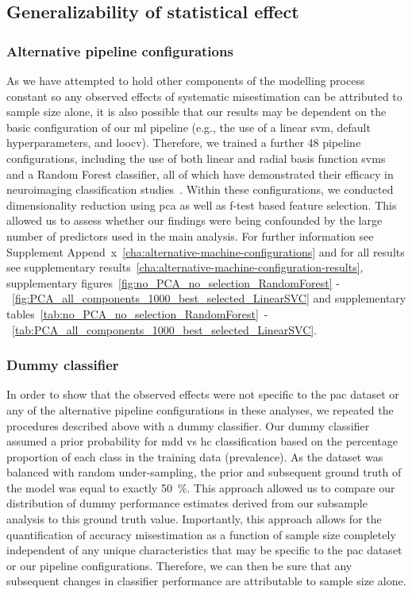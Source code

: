 \documentclass[12pt,a4paper]{article}
\begin{document}
    \subsection{Generalizability of statistical effect}

    \subsubsection{Alternative pipeline configurations}
    As we have attempted to hold other components of the modelling process constant so any observed effects of systematic misestimation can be attributed to sample size alone, it is also possible that our results may be dependent on the basic configuration of our \ac{ml} pipeline (e.g., the use of a linear \ac{svm}, default hyperparameters, and \ac{loocv}). Therefore, we trained a further \num{48} pipeline configurations, including the use of both linear and radial basis function \acp{svm} and a Random Forest classifier, all of which have demonstrated their efficacy in neuroimaging classification studies~\cite{Kambeitz2017}. Within these configurations, we conducted dimensionality reduction using \ac{pca} as well as f-test based feature selection. This allowed us to assess whether our findings were being confounded by the large number of predictors used in the main analysis. For further information see Supplement Append~x~\ref{cha:alternative-machine-configurations} and for all results see supplementary results~\ref{cha:alternative-machine-configuration-results}, supplementary figures~\ref{fig:no_PCA_no_selection_RandomForest} -~\ref{fig:PCA_all_components_1000_best_selected_LinearSVC} and supplementary tables~\ref{tab:no_PCA_no_selection_RandomForest}~-~\ref{tab:PCA_all_components_1000_best_selected_LinearSVC}.

    \subsubsection{Dummy classifier}
    In order to show that the observed effects were not specific to the \ac{pac} dataset or any of the alternative pipeline configurations in these analyses, we repeated the procedures described above with a dummy classifier. Our dummy classifier assumed a prior probability for \ac{mdd} vs \ac{hc} classification based on the percentage proportion of each class in the training data (prevalence). As the dataset was balanced with random under-sampling, the prior and subsequent ground truth of the model was equal to exactly \SI{50}{\percent}. This approach allowed us to compare our distribution of dummy performance estimates derived from our subsample analysis to this ground truth value. Importantly, this approach allows for the quantification of accuracy misestimation as a function of sample size completely independent of any unique characteristics that may be specific to the \ac{pac} dataset or our pipeline configurations. Therefore, we can then be sure that any subsequent changes in classifier performance are attributable to sample size alone.
\end{document}

